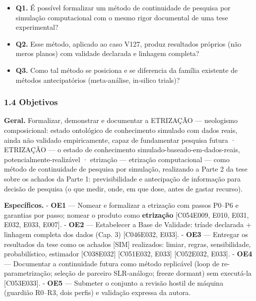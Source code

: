 \documentclass[
  10pt,
]{article}
\providecommand{\tightlist}{%
  \setlength{\itemsep}{0pt}\setlength{\parskip}{0pt}}
\begin{document}
\begin{itemize}
\tightlist
\item
  \textbf{Q1.} É possível formalizar um método de continuidade de
  pesquisa por simulação computacional com o mesmo rigor documental de
  uma tese experimental?
\item
  \textbf{Q2.} Esse método, aplicado ao caso V127, produz resultados
  próprios (não meros planos) com validade declarada e linhagem
  completa?
\item
  \textbf{Q3.} Como tal método se posiciona e se diferencia da família
  existente de métodos antecipatórios (meta-análise, in-silico trials)?
\end{itemize}

\hypertarget{objetivos}{%
\subsubsection{1.4 Objetivos}\label{objetivos}}

\textbf{Geral.} Formalizar, demonstrar e documentar a ETRIZAÇÃO ---
neologismo composicional: estado ontológico de conhecimento simulado com
dados reais, ainda não validado empiricamente, capaz de fundamentar
pesquisa futura · ETRIZAÇÃO --- o estado de conhecimento
simulado-baseado-em-dados-reais, potencialmente-realizável · etrização
--- etrização computacional --- como método de continuidade de pesquisa
por simulação, realizando a Parte 2 da tese sobre os achados da Parte 1:
previsibilidade e antecipação de informação para decisão de pesquisa (o
que medir, onde, em que dose, antes de gastar recurso).

\textbf{Específicos.} - \textbf{OE1} --- Nomear e formalizar a etrização
com passos P0--P6 e garantias por passo; nomear o produto como
\textbf{etrização} {[}C054\textbar E009, E010, E031, E032, E033,
E007{]}. - \textbf{OE2} --- Estabelecer a Base de Validade: tríade
declarada + linhagem completa dos dados (Cap. 3) {[}C046\textbar E032,
E033{]}. - \textbf{OE3} --- Entregar os resultados da tese como os
achados {[}SIM{]} realizados: limiar, regras, sensibilidade,
probabilístico, estimador {[}C038\textbar E032{]} {[}C051\textbar E032,
E033{]} {[}C052\textbar E032, E033{]}. - \textbf{OE4} --- Documentar a
continuidade futura como método replicável (loop de re-parametrização;
seleção de parceiro SLR-análogo; freeze dormant) sem executá-la
{[}C053\textbar E033{]}. - \textbf{OE5} --- Submeter o conjunto a
revisão hostil de máquina (guardião R0--R3, dois perfis) e validação
expressa da autora.
\end{document}

